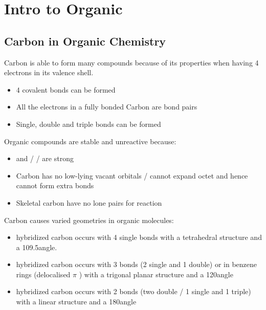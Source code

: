 \documentclass[../main]{subfiles}
\begin{document}
\section{Intro to Organic}


	\subsection{Carbon in Organic Chemistry}

	Carbon  is able to form many compounds because of its properties when having 4 electrons in its valence shell.

	\begin{itemize}
		\item 4 covalent bonds can be formed
		\item All the electrons in a fully bonded Carbon are bond pairs
		\item Single, double and triple bonds can be formed
	\end{itemize}

	Organic compounds are stable and unreactive because:

	\begin{itemize}
		\item {} and  /  /  are strong
		\item Carbon has no low-lying vacant orbitals / cannot expand octet and hence cannot form extra bonds
		\item Skeletal carbon have no lone pairs for reaction
	\end{itemize}

	Carbon causes varied geometries in organic molecules:

	\begin{itemize}
		\item {} hybridized carbon occurs with 4 single bonds with a tetrahedral structure and a 109.5\degree angle.
		\item {} hybridized carbon occurs with 3 bonds (2 single and 1 double) or in benzene rings (delocalised \(\pi\) ) with a trigonal planar structure and a 120\degree angle
		\item {} hybridized carbon occurs with 2 bonds (two double / 1 single and 1 triple) with a linear structure and a 180\degree angle
	\end{itemize}
\end{document}
